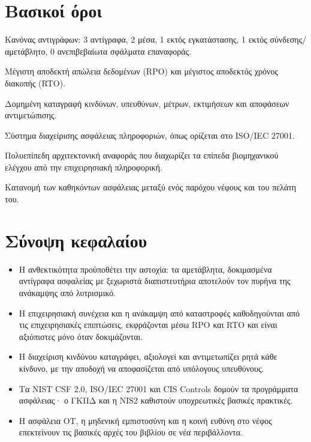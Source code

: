 \section*{Βασικοί όροι}
\begin{description}[style=nextline,leftmargin=1.2em]
  \item[3-2-1-1-0] Κανόνας αντιγράφων: 3 αντίγραφα, 2 μέσα, 1 εκτός εγκατάστασης, 1 εκτός σύνδεσης/αμετάβλητο, 0 ανεπιβεβαίωτα σφάλματα επαναφοράς.
  \item[RPO / RTO] Μέγιστη αποδεκτή απώλεια δεδομένων (RPO) και μέγιστος αποδεκτός χρόνος διακοπής (RTO).
  \item[Μητρώο κινδύνων] Δομημένη καταγραφή κινδύνων, υπευθύνων, μέτρων, εκτιμήσεων και αποφάσεων αντιμετώπισης.
  \item[ΣΔΑΠ (ISMS)] Σύστημα διαχείρισης ασφάλειας πληροφοριών, όπως ορίζεται στο ISO/IEC 27001.
  \item[Μοντέλο Purdue] Πολυεπίπεδη αρχιτεκτονική αναφοράς που διαχωρίζει τα επίπεδα βιομηχανικού ελέγχου από την επιχειρησιακή πληροφορική.
  \item[Κοινή ευθύνη] Κατανομή των καθηκόντων ασφάλειας μεταξύ ενός παρόχου νέφους και του πελάτη του.
\end{description}

\section*{Σύνοψη κεφαλαίου}
\begin{itemize}
  \item Η ανθεκτικότητα προϋποθέτει την αστοχία: τα αμετάβλητα, δοκιμασμένα αντίγραφα ασφαλείας με ξεχωριστά διαπιστευτήρια αποτελούν τον πυρήνα της ανάκαμψης από λυτρισμικό.
  \item Η επιχειρησιακή συνέχεια και η ανάκαμψη από καταστροφές καθοδηγούνται από τις επιχειρησιακές επιπτώσεις, εκφράζονται μέσω RPO και RTO και είναι αξιόπιστες μόνο όταν δοκιμάζονται.
  \item Η διαχείριση κινδύνου καταγράφει, αξιολογεί και αντιμετωπίζει ρητά κάθε κίνδυνο, με την αποδοχή να αποφασίζεται από υπόλογους υπευθύνους.
  \item Τα NIST CSF 2.0, ISO/IEC 27001 και CIS Controls δομούν τα προγράμματα ασφάλειας· ο ΓΚΠΔ και η NIS2 καθιστούν υποχρεωτικές βασικές πρακτικές.
  \item Η ασφάλεια OT, η μηδενική εμπιστοσύνη και η κοινή ευθύνη στο νέφος επεκτείνουν τις βασικές αρχές του βιβλίου σε νέα περιβάλλοντα.
\end{itemize}

